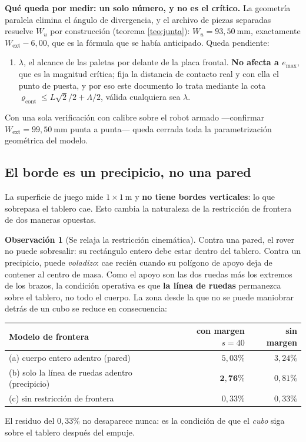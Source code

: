 \documentclass[11pt,a4paper]{article}
\theoremstyle{definition}
\newtheorem{observacion}[teorema]{Observación}
\begin{document}
\begin{tcolorbox}[colback=black!3,colframe=black!50,boxrule=0.5pt,arc=1pt]
\textbf{Qué queda por medir: un solo número, y no es el crítico.} La geometría paralela
elimina el ángulo de divergencia, y el archivo de piezas separadas resuelve $W_u$ por
construcción (teorema \ref{teo:junta}): $W_u = 93{,}50\ \mathrm{mm}$, exactamente
$W_{\mathrm{ext}} - 6{,}00$, que es la fórmula que se había anticipado. Queda pendiente:
\begin{enumerate}[label=\arabic*.,leftmargin=2.2em,itemsep=2pt]
\item $\lambda$, el alcance de las paletas por delante de la placa frontal. \textbf{No
      afecta a $e_{\max}$}, que es la magnitud crítica; fija la distancia de contacto
      real y con ella el punto de puesta, y por eso este documento lo trata mediante la
      cota $\varrho_{\mathrm{cont}} \le L\sqrt2/2 + \Lambda/2$, válida cualquiera sea
      $\lambda$.
\end{enumerate}
Con una sola verificación con calibre sobre el robot armado ---confirmar
$W_{\mathrm{ext}} = 99{,}50\ \mathrm{mm}$ punta a punta--- queda cerrada toda la
parametrización geométrica del modelo.
\end{tcolorbox}

\subsection{El borde es un precipicio, no una pared}
\label{sec:precipicio}

La superficie de juego mide $1 \times 1\ \mathrm{m}$ y \textbf{no tiene bordes
verticales}: lo que sobrepasa el tablero cae. Esto cambia la naturaleza de la
restricción de frontera de dos maneras opuestas.

\begin{observacion}[Se relaja la restricción cinemática]
Contra una pared, el rover no puede sobresalir: su rectángulo entero debe estar dentro
del tablero. Contra un precipicio, puede \emph{voladizo}: cae recién cuando su polígono
de apoyo deja de contener al centro de masa. Como el apoyo son las dos ruedas más los
extremos de los brazos, la condición operativa es que \textbf{la línea de ruedas}
permanezca sobre el tablero, no todo el cuerpo. La zona desde la que no se puede
maniobrar detrás de un cubo se reduce en consecuencia:

\medskip
\centering
\begin{tabular}{lrr}
\toprule
Modelo de frontera & con margen $s=40$ & sin margen \\
\midrule
(a) cuerpo entero adentro (pared) & $5{,}03\%$ & $3{,}24\%$ \\
(b) solo la línea de ruedas adentro (precipicio) & $\mathbf{2{,}76\%}$ & $0{,}81\%$ \\
(c) sin restricción de frontera & $0{,}33\%$ & $0{,}33\%$ \\
\bottomrule
\end{tabular}

\raggedright
\medskip
El residuo del $0{,}33\%$ no desaparece nunca: es la condición de que el \emph{cubo}
siga sobre el tablero después del empuje.
\end{observacion}
\end{document}
